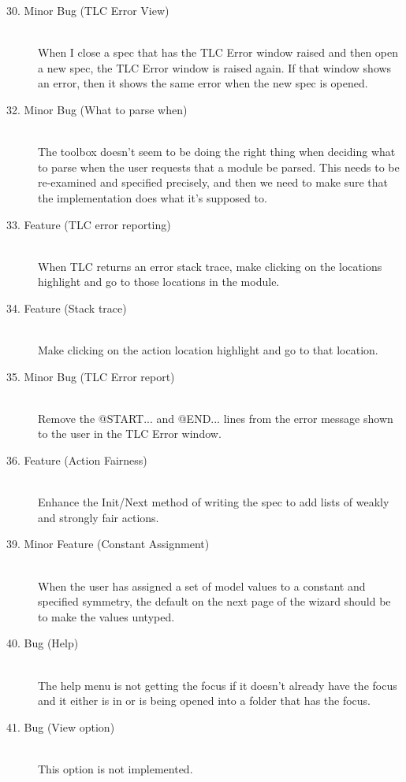 \documentclass{article}
\begin{document}
\begin{description}
\item[30. Minor Bug (TLC Error View)] \mbox{}\\
%
When I close a spec that has the TLC Error window raised and then open
a new spec, the TLC Error window is raised again.  If that window
shows an error, then it shows the same error when the new spec is
opened.
 
\item[32. Minor Bug (What to parse when)] \mbox{}\\
%
The toolbox doesn't seem to be doing the right thing when deciding
what to parse when the user requests that a module be parsed.  This
needs to be re-examined and specified precisely, and then we need to
make sure that the implementation does what it's supposed to.

\item[33. Feature (TLC error reporting)] \mbox{}\\
%
When TLC returns an error stack trace, make clicking on the locations
highlight and go to those locations in the module.

\item[34. Feature (Stack trace)] \mbox{}\\
%
Make clicking on the action location highlight and go to that
location.
    
\item[35. Minor Bug (TLC Error report)] \mbox{}\\
%
Remove the @START...  and @END...  lines from the error message shown
to the user in the TLC Error window.  

\item[36. Feature (Action Fairness)] \mbox{}\\
%
Enhance the Init/Next method of writing the spec to add lists of
weakly and strongly fair actions.
    
\item[39. Minor Feature (Constant Assignment)] \mbox{}\\
%
When the user has assigned a set of model values to a constant
and specified symmetry, the default on the next page of the wizard
should be to make the values untyped.  

\item[40. Bug (Help)] \mbox{}\\
%
The help menu is not getting the focus if it doesn't already have the
focus and it either is in or is being opened into a folder that has
the focus.

\item[41. Bug (View option)] \mbox{}\\
%
This option is not implemented.


\end{description}
\end{document}
